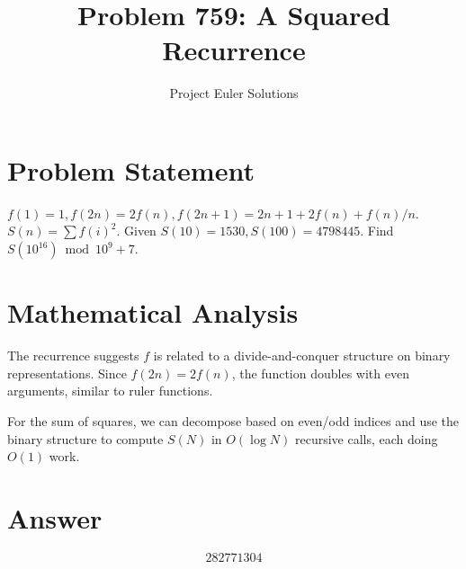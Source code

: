 \documentclass[11pt]{article}
\title{Problem 759: A Squared Recurrence}
\author{Project Euler Solutions}
\date{}
\begin{document}
\maketitle


\section{Problem Statement}
$f(1)=1, f(2n)=2f(n), f(2n+1)=2n+1+2f(n)+f(n)/n$. $S(n)=\sum f(i)^2$. Given $S(10)=1530, S(100)=4798445$. Find $S(10^{{16}}) \bmod 10^9+7$.

\section{Mathematical Analysis}
The recurrence suggests $f$ is related to a divide-and-conquer structure on binary representations. Since $f(2n)=2f(n)$, the function doubles with even arguments, similar to ruler functions.

For the sum of squares, we can decompose based on even/odd indices and use the binary structure to compute $S(N)$ in $O(\log N)$ recursive calls, each doing $O(1)$ work.

\section{Answer}

\[
\boxed{282771304}
\]
\end{document}
